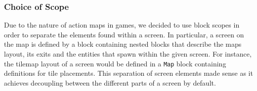 \subsubsection{Choice of Scope}
Due to the nature of action maps in games, we decided to use block scopes in order to separate the elements found within a screen.
In particular, a screen on the map is defined by a block containing nested blocks that describe the maps layout, its exits and the entities that spawn within the given screen.
For instance, the tilemap layout of a screen would be defined in a \texttt{Map} block containing definitions for tile placements.
This separation of screen elements made sense as it achieves decoupling between the different parts of a screen by default.
